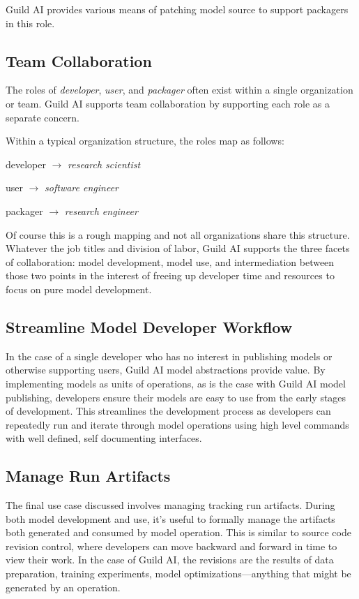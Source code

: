 \documentclass{article}
\begin{document}
Guild AI provides various means of patching model source to support
packagers in this role.

\subsection{Team Collaboration}

The roles of \emph{developer}, \emph{user}, and \emph{packager} often
exist within a single organization or team. Guild AI supports team
collaboration by supporting each role as a separate concern.

Within a typical organization structure, the roles map as follows:

\setlength{\parindent}{1em}
developer $\rightarrow$ \emph{research scientist}

user $\rightarrow$ \emph{software engineer}

packager $\rightarrow$ \emph{research engineer}
\setlength{\parindent}{0em}

Of course this is a rough mapping and not all organizations share this
structure. Whatever the job titles and division of labor, Guild AI
supports the three facets of collaboration: model development, model
use, and intermediation between those two points in the interest of
freeing up developer time and resources to focus on pure model
development.

\subsection{Streamline Model Developer Workflow}
\label{sec:streamline-workflow}

In the case of a single developer who has no interest in publishing
models or otherwise supporting users, Guild AI model abstractions
provide value. By implementing models as units of operations, as is
the case with Guild AI model publishing, developers ensure their
models are easy to use from the early stages of development. This
streamlines the development process as developers can repeatedly run
and iterate through model operations using high level commands with
well defined, self documenting interfaces.

\subsection{Manage Run Artifacts}

The final use case discussed involves managing tracking run artifacts.
During both model development and use, it's useful to formally manage
the artifacts both generated and consumed by model operation. This is
similar to source code revision control, where developers can move
backward and forward in time to view their work. In the case of Guild
AI, the revisions are the results of data preparation, training
experiments, model optimizations---anything that might be generated by
an operation.
\end{document}
